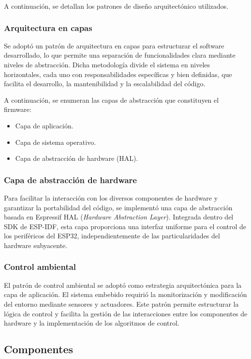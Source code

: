 A continuación, se detallan los patrones de diseño arquitectónico utilizados.

\subsubsection{Arquitectura en capas}
Se adoptó un patrón de arquitectura en capas para estructurar el software desarrollado, lo que permite una separación de funcionalidades clara mediante niveles de abstracción. Dicha metodología divide el sistema en niveles horizontales, cada uno con responsabilidades específicas y bien definidas, que facilita el desarrollo, la mantenibilidad y la escalabilidad del código.

A continuación, se enumeran las capas de abstracción que constituyen el firmware:

\begin{itemize}
	\item Capa de aplicación.
	\item Capa de sistema operativo.
	\item Capa de abstracción de hardware (HAL).
\end{itemize}


\subsubsection{Capa de abstracción de hardware}

Para facilitar la interacción con los diversos componentes de hardware y garantizar la portabilidad del código, se implementó una capa de abstracción basada en Espressif HAL (\textit{Hardware Abstraction Layer}). Integrada dentro del SDK de ESP-IDF, esta capa proporciona una interfaz uniforme para el control de los periféricos del ESP32, independientemente de las particularidades del hardware subyacente.

\subsubsection{Control ambiental}

El patrón de control ambiental se adoptó como estrategia arquitectónica para la capa de aplicación. El sistema embebido requirió la monitorización y modificación del entorno mediante sensores y actuadores. Este patrón permite estructurar la lógica de control y facilita la gestión de las interacciones entre los componentes de hardware y la implementación de los algoritmos de control.


\subsection{Componentes}

